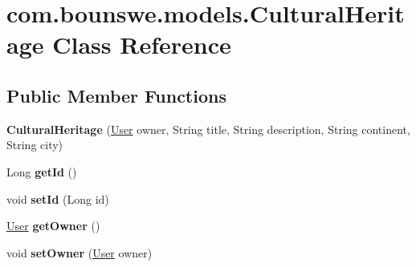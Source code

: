 \hypertarget{classcom_1_1bounswe_1_1models_1_1_cultural_heritage}{}\section{com.\+bounswe.\+models.\+Cultural\+Heritage Class Reference}
\label{classcom_1_1bounswe_1_1models_1_1_cultural_heritage}
\subsection*{Public Member Functions}
\begin{DoxyCompactItemize}
\item 
\mbox{\label{classcom_1_1bounswe_1_1models_1_1_cultural_heritage_a482685d9083f51bee29ce27a6f27ba6d}} 
{\bfseries Cultural\+Heritage} (\hyperlink{classcom_1_1bounswe_1_1models_1_1_user}{User} owner, String title, String description, String continent, String city)
\item 
\mbox{\label{classcom_1_1bounswe_1_1models_1_1_cultural_heritage_a19573e9d978cc6c42eeb7af4b1e4d5f9}} 
Long {\bfseries get\+Id} ()
\item 
\mbox{\label{classcom_1_1bounswe_1_1models_1_1_cultural_heritage_a839bf6b346ce83b74904dca19814223f}} 
void {\bfseries set\+Id} (Long id)
\item 
\mbox{\label{classcom_1_1bounswe_1_1models_1_1_cultural_heritage_adcc400141de3d766acbe95d82aaef36b}} 
\hyperlink{classcom_1_1bounswe_1_1models_1_1_user}{User} {\bfseries get\+Owner} ()
\item 
\mbox{\label{classcom_1_1bounswe_1_1models_1_1_cultural_heritage_ad82eeb34dc74822f969b8b90e6c456b2}} 
void {\bfseries set\+Owner} (\hyperlink{classcom_1_1bounswe_1_1models_1_1_user}{User} owner)
\item 
\mbox{\label{classcom_1_1bounswe_1_1models_1_1_cultural_heritage_a6ace6422a9733850d0d758b937647b3b}} 

\end{DoxyCompactItemize}
